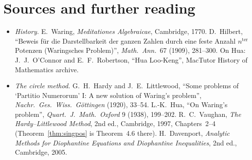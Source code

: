 \section*{Sources and further reading}

\begin{itemize}
\item \emph{History.} E.~Waring, \emph{Meditationes Algebraicae}, Cambridge, 1770. D.~Hilbert, ``Beweis für die Darstellbarkeit der ganzen Zahlen durch eine feste Anzahl $n^{\text{ter}}$ Potenzen (Waringsches Problem)'', \emph{Math.\ Ann.}\ 67 (1909), 281--300. On Hua: J.~J.~O'Connor and E.~F.~Robertson, ``Hua Loo-Keng'', MacTutor History of Mathematics archive.
\item \emph{The circle method.} G.~H.~Hardy and J.~E.~Littlewood, ``Some problems of `Partitio Numerorum' I: A new solution of Waring's problem'', \emph{Nachr.\ Ges.\ Wiss.\ Göttingen} (1920), 33--54. L.-K.~Hua, ``On Waring's problem'', \emph{Quart.\ J.\ Math.\ Oxford} 9 (1938), 199--202. R.~C.~Vaughan, \emph{The Hardy--Littlewood Method}, 2nd ed., Cambridge, 1997, Chapters~2--4 (Theorem~\ref{thm:singpos} is Theorem~4.6 there). H.~Davenport, \emph{Analytic Methods for Diophantine Equations and Diophantine Inequalities}, 2nd ed., Cambridge, 2005.
\end{itemize}
